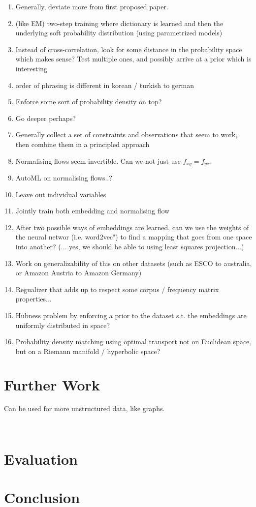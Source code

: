 \documentclass[a4paper,12pt,twoside,openright]{report}
\begin{document}
\begin{enumerate}
\item Generally, deviate more from first proposed paper.
\item (like EM) two-step training where dictionary is learned and then the underlying soft probability distribution (using parametrized models)
\item Instead of cross-correlation, look for some distance in the probability space which makes sense? Test multiple ones, and possibly arrive at a prior which is interesting
\item order of phrasing is different in korean / turkish to german
\item Enforce some sort of probability density on top?
\item Go deeper perhaps?
\item Generally collect a set of constraints and observations that seem to work, then combine them in a principled approach
\item Normalising flows seem invertible. Can we not just use $f_{xy} = f_{yx}$.
\item AutoML on normalising flows..?
\item Leave out individual variables
\item Jointly train both embedding and normalising flow
\item After two possible ways of embeddings are learned, can we use the weights of the neural networ (i.e. word2vec") to find a mapping that goes from one space into another? (... yes, we should be able to using least squares projection...)
\item Work on generalizability of this on other datasets (such as ESCO to australia, or Amazon Austria to Amazon Germany)
\item Regualizer that adds up to respect some corpus / frequency matrix properties...
\item Hubness problem by enforcing a prior to the dataset s.t. the embeddings are uniformly distributed in space?
\item Probability density matching using optimal transport not on Euclidean space, but on a Riemann manifold / hyperbolic space?
\end{enumerate}

\chapter{Further Work}

Can be used for more unstructured data, like graphs.

\
\chapter{Evaluation}

\chapter{Conclusion}

\appendix
\singlespacing

 
% 
\end{document}

